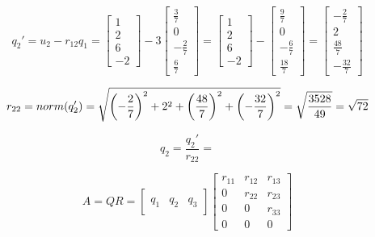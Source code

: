 \documentclass[a4paper,12pt]{article}
\begin{document}
\[
q_2' = u_2 - r_{12}q_1 = 
\left[\begin{array}{c}
    1\\
    2\\
    6\\
    -2
\end{array}\right]
- 
3
\left[\begin{array}{c}
    \frac{3}{7}\\
    0\\
    -\frac{2}{7}\\
    \frac{6}{7}
\end{array}\right]
=
\left[\begin{array}{c}
    1\\
    2\\
    6\\
    -2
\end{array}\right]
-
\left[\begin{array}{c}
    \frac{9}{7}\\
    0\\
    -\frac{6}{7}\\
    \frac{18}{7}
\end{array}\right]
=
\left[\begin{array}{c}
    -\frac{2}{7}\\
    2\\
    \frac{48}{7}\\
    -\frac{32}{7}
\end{array}\right]
\]

\[
r_{22} = norm(q_2') 
= 
\sqrt{\left( -\frac{2}{7}\right)^2 + 2^2 + \left( \frac{48}{7}\right)^2 + \left( -\frac{32}{7}\right)^2 }
= 
\sqrt{\frac{3528}{49}}
=
\sqrt{72}
\]

\[
q_2 = 
\frac{q_2'}{r_{22}} 
=
\]

\[
A = QR = 
\left[\begin{array}{c|c|c}
     &  & \\
    q_1 & q_2 & q_3 \\
     &  & 
\end{array}\right]
\left[\begin{array}{ccc}
    r_{11} & r_{12} & r_{13}\\
    0 & r_{22} & r_{23} \\
    0 & 0 & r_{33}\\
    0 & 0 & 0
\end{array}\right]
\]

\subsection{}
\end{document}
